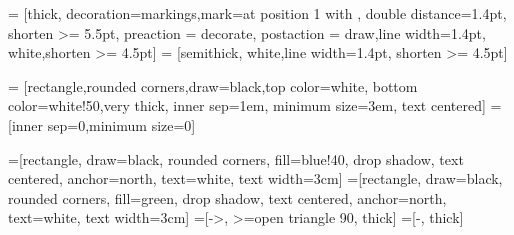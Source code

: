 \usepackage{tikz}
\usetikzlibrary{arrows, decorations.markings}
\usetikzlibrary{positioning,shapes,shadows,calc,positioning}



 = [thick, decoration={markings,mark=at position
   1 with {}},
   double distance=1.4pt, shorten >= 5.5pt,
   preaction = {decorate},
   postaction = {draw,line width=1.4pt, white,shorten >= 4.5pt}]
 = [semithick, white,line width=1.4pt, shorten >= 4.5pt]


 = [rectangle,rounded corners,draw=black,top color=white, bottom color=white!50,very thick, inner sep=1em, minimum size=3em, text centered]
 = [inner sep=0,minimum size=0]

=[rectangle, draw=black, rounded corners, fill=blue!40, drop shadow, text centered, anchor=north, text=white, text width=3cm]
=[rectangle, draw=black, rounded corners, fill=green, drop shadow, text centered, anchor=north, text=white, text width=3cm]
=[->, >=open triangle 90, thick]
=[-, thick]




\usepackage{etex}
\newcommand{\CC}{C\nolinebreak\hspace{-.05em}\raisebox{.4ex}{\tiny\bf +}\nolinebreak\hspace{-.03em}\raisebox{.4ex}{\tiny\bf +}}
